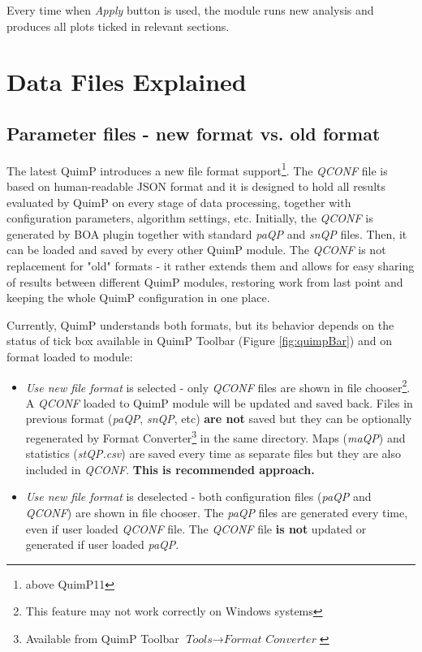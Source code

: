 \documentclass[a4paper,12pt]{article}
\begin{document}
Every time when \textit{Apply} button is used, the module runs new analysis and produces all plots ticked in relevant sections.  

\section{Data Files Explained}
\label{sec:DataFilesExplained}

\subsection{Parameter files - new format vs. old format}
The latest QuimP introduces a new file format support\footnote{above QuimP11}. The \textit{QCONF} file is based on human-readable JSON format and it is designed to hold all results evaluated by QuimP on every stage of data processing, together with configuration parameters, algorithm settings, etc. 
Initially, the \textit{QCONF} is generated by BOA plugin together with standard \textit{paQP} and \textit{snQP} files. Then, it can be loaded and saved by every other QuimP module. The \textit{QCONF} is not replacement for "old" formats - it rather extends them and allows for easy sharing of results between different QuimP modules, restoring work from last point and keeping the whole QuimP configuration in one place.   

Currently, QuimP understands both formats, but its behavior depends on the status of tick box available in QuimP Toolbar (Figure \ref{fig:quimpBar}) and on format loaded to module:
\begin{itemize}
	\item \textit{Use new file format} is selected - only \textit{QCONF} files are shown in file chooser\footnote{This feature may not work correctly on Windows systems}. A \textit{QCONF} loaded to QuimP module will be updated and saved back. Files in previous format (\textit{paQP}, \textit{snQP}, etc) \textbf{are not} saved but they can be optionally regenerated by Format Converter\footnote{Available from QuimP Toolbar $\textit{Tools}\rightarrow\textit{Format Converter}$} in the same directory. Maps (\textit{maQP}) and statistics (\textit{stQP.csv}) are saved every time as separate files but they are also included in \textit{QCONF}.	\textbf{This is recommended approach.}
	\item \textit{Use new file format} is deselected - both configuration files (\textit{paQP} and \textit{QCONF}) are shown in file chooser. The \textit{paQP} files are generated every time, even if user loaded \textit{QCONF} file. The \textit{QCONF} file \textbf{is not} updated or generated if user loaded \textit{paQP}. 
\end{itemize}   
\end{document}
